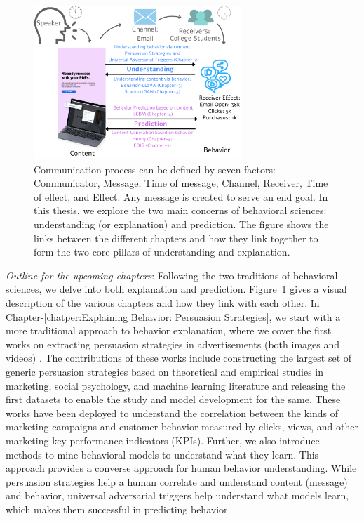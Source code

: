 \begin{figure}[!t]
  \centering
  \includegraphics[width=0.7\textwidth]{images/thesis-link.pdf}
  \caption{Communication process can be defined by seven factors: Communicator, Message, Time of message, Channel, Receiver, Time of effect, and Effect. Any message is created to serve an end goal. In this thesis, we explore the two main concerns of behavioral sciences: understanding (or explanation) and prediction. The figure shows the links between the different chapters and how they link together to form the two core pillars of understanding and explanation. \label{fig:factors-of-communication-thesis-links}}
\end{figure}



\textit{Outline for the upcoming chapters}: Following the two traditions of behavioral sciences, we delve into both explanation and prediction. Figure~\ref{fig:factors-of-communication-thesis-links} gives a visual description of the various chapters and how they link with each other. In Chapter-\ref{chatper:Explaining Behavior: Persuasion Strategies}, we start with a more traditional approach to behavior explanation, where we cover the first works on extracting persuasion strategies in advertisements (both images and videos) \cite{kumar2023persuasion,bhattacharya2023video}. The contributions of these works include constructing the largest set of generic persuasion strategies based on theoretical and empirical studies in marketing, social psychology, and machine learning literature and releasing the first datasets to enable the study and model development for the same. These works have been deployed to understand the correlation between the kinds of marketing campaigns and customer behavior measured by clicks, views, and other marketing key performance indicators (KPIs). Further, we also introduce methods to mine behavioral models to understand what they learn. This approach provides a converse approach for human behavior understanding. While persuasion strategies help a human correlate and understand content (message) and behavior, universal adversarial triggers help understand what models learn, which makes them successful in predicting behavior.




